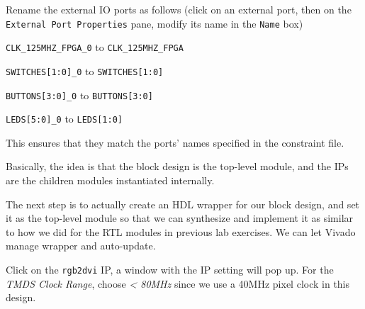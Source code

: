 \documentclass[11pt]{article}
\begin{document}
Rename the external IO ports as follows (click on an external port, then on the \texttt{External Port Properties} pane, modify its name in the \texttt{Name} box)

\texttt{CLK\_125MHZ\_FPGA\_0} to \texttt{CLK\_125MHZ\_FPGA}

\texttt{SWITCHES[1:0]\_0} to \texttt{SWITCHES[1:0]}

\texttt{BUTTONS[3:0]\_0} to \texttt{BUTTONS[3:0]}

\texttt{LEDS[5:0]\_0} to \texttt{LEDS[1:0]}

This ensures that they match the ports' names specified in the constraint file.

Basically, the idea is that the block design is the top-level module, and the IPs are the children modules instantiated internally.

The next step is to actually create an HDL wrapper for our block design, and set it as the top-level module so that we can synthesize and implement it as similar to how we did for the RTL modules in previous lab exercises. We can let Vivado manage wrapper and auto-update.

\begin{center}
\end{center}

Click on the \texttt{rgb2dvi} IP, a window with the IP setting will pop up. For the \emph{TMDS Clock Range}, choose \emph{< 80MHz} since we use a 40MHz pixel clock in this design.

\begin{center}
\end{center}
\end{document}
